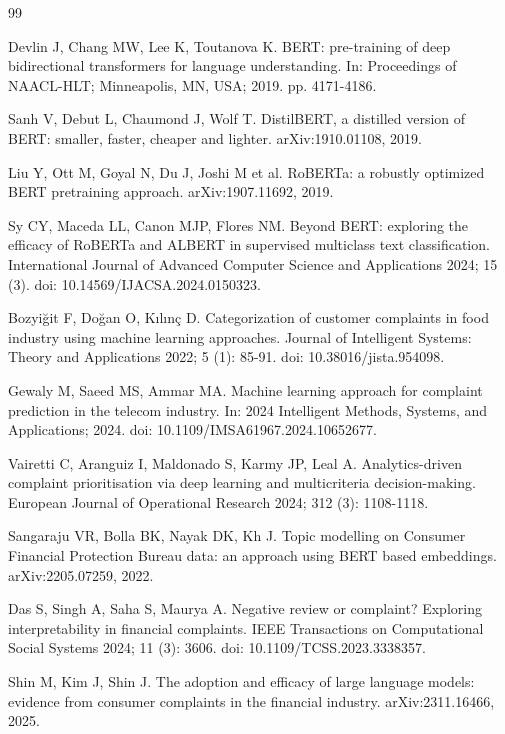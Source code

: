 \documentclass{elektr}
\begin{document}
\begin{thebibliography}{99}
\setlength{\itemsep}{1pt}
\setlength{\parsep}{0pt}

 Devlin J, Chang MW, Lee K, Toutanova K. BERT: pre-training of deep bidirectional transformers for language understanding. In: Proceedings of NAACL-HLT; Minneapolis, MN, USA; 2019. pp. 4171-4186.

 Sanh V, Debut L, Chaumond J, Wolf T. DistilBERT, a distilled version of BERT: smaller, faster, cheaper and lighter. arXiv:1910.01108, 2019.

 Liu Y, Ott M, Goyal N, Du J, Joshi M et al. RoBERTa: a robustly optimized BERT pretraining approach. arXiv:1907.11692, 2019.

 Sy CY, Maceda LL, Canon MJP, Flores NM. Beyond BERT: exploring the efficacy of RoBERTa and ALBERT in supervised multiclass text classification. International Journal of Advanced Computer Science and Applications 2024; 15 (3). doi: 10.14569/IJACSA.2024.0150323.

 Bozyiğit F, Doğan O, Kılınç D. Categorization of customer complaints in food industry using machine learning approaches. Journal of Intelligent Systems: Theory and Applications 2022; 5 (1): 85-91. doi: 10.38016/jista.954098.

 Gewaly M, Saeed MS, Ammar MA. Machine learning approach for complaint prediction in the telecom industry. In: 2024 Intelligent Methods, Systems, and Applications; 2024. doi: 10.1109/IMSA61967.2024.10652677.

 Vairetti C, Aranguiz I, Maldonado S, Karmy JP, Leal A. Analytics-driven complaint prioritisation via deep learning and multicriteria decision-making. European Journal of Operational Research 2024; 312 (3): 1108-1118.

 Sangaraju VR, Bolla BK, Nayak DK, Kh J. Topic modelling on Consumer Financial Protection Bureau data: an approach using BERT based embeddings. arXiv:2205.07259, 2022.

 Das S, Singh A, Saha S, Maurya A. Negative review or complaint? Exploring interpretability in financial complaints. IEEE Transactions on Computational Social Systems 2024; 11 (3): 3606. doi: 10.1109/TCSS.2023.3338357.

 Shin M, Kim J, Shin J. The adoption and efficacy of large language models: evidence from consumer complaints in the financial industry. arXiv:2311.16466, 2025.


\end{thebibliography}
\end{document}

